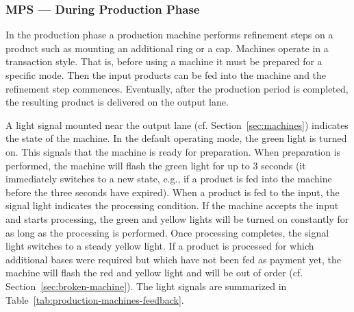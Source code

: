\documentclass[12pt,twoside]{article}
\newcommand{\refsec}[1]{Section~\ref{#1}}
\newcommand{\reftab}[1]{Table~\ref{#1}}
\begin{document}
\subsubsection{MPS --- During Production Phase}
\label{sec:production-machines-production}
In the production phase a production machine performs refinement steps on
a product such as mounting an additional ring or a cap. Machines
operate in a transaction style. That is, before using a machine it
must be prepared for a specific mode. Then the input products can be fed
into the machine and the refinement step commences. Eventually, after
the production period is completed, the resulting product is delivered
on the output lane.

A light signal mounted near the output lane
(cf. \refsec{sec:machines}) indicates the state of the machine. In the
default operating mode, the green light is turned on. This signals
that the machine is ready for preparation. When preparation is performed,
the machine will flash the green light for up to 3 seconds (it
immediately switches to a new state, e.g., if a product is fed into the
machine before the three seconds have expired). When a product is fed
to the input, the signal light indicates the processing condition. If
the machine accepts the input and starts processing, the green and yellow lights
will be turned on constantly for as long as the processing is
performed. Once processing completes, the signal light switches to a
steady yellow light. If a product is processed for which additional bases
were required but which have not been fed as payment yet, the machine will
flash the red and yellow light and will be out of order
(cf. \refsec{sec:broken-machine}). The light signals are summarized in
\reftab{tab:production-machines-feedback}.
\end{document}
